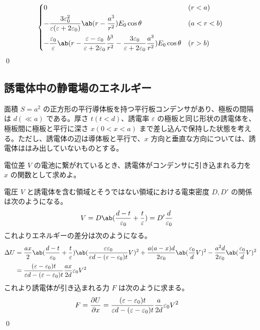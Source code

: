\documentclass[uplatex,dvipdfmx,a4paper,11pt]{jlreq}
\makeatletter
\numberwithin{equation}{section}
\theoremstyle{definition}
\renewenvironment{proof}[1][\proofname]{\par
  \normalfont
  \topsep6\p@\@plus6\p@ \trivlist
  \item[\hskip\labelsep{\bfseries #1}\@addpunct{\bfseries}]\ignorespaces\quad\par
}{%
  \qed\endtrivlist\@endpefalse
}
\renewcommand\proofname{証明}
\makeatother
\begin{document}
\begin{proof}
\begin{align}
\begin{dcases}
                          0                                                                                                                                                                                                            & (r < a)     \\
                          -\frac{3\varepsilon_0^2}{\varepsilon(\varepsilon + 2\varepsilon_0)}\ab(r - \frac{a^3}{r^2})E_0\cos\theta                                                                                                     & (a < r < b) \\
                          -\frac{\varepsilon_0}{\varepsilon}\ab(r - \frac{\varepsilon - \varepsilon_0}{\varepsilon + 2\varepsilon_0}\frac{b^3}{r^2} - \frac{3\varepsilon_0}{\varepsilon + 2\varepsilon_0}\frac{a^3}{r^2})E_0\cos\theta & (r > b)     \\
                        \end{dcases}
  \end{align}
\end{proof}


\subsection{誘電体中の静電場のエネルギー}
面積 $S = a^2$ の正方形の平行導体板を持つ平行板コンデンサがあり、極板の間隔は $d (\ll a)$ である。厚さ $t (t < d)$、誘電率 $\varepsilon$ の極板と同じ形状の誘電体を、極板間に極板と平行に深さ $x (0 < x < a)$ まで差し込んで保持した状態を考える。ただし、誘電体の辺は導体板と平行で、$x$ 方向と垂直な方向については、誘電体ははみ出していないものとする。
\begin{problem}
電位差 $V$ の電池に繋がれているとき、誘電体がコンデンサに引き込まれる力を $x$ の関数として求めよ。
\end{problem}
\begin{proof}
  電圧 $V$ と誘電体を含む領域とそうではない領域における電束密度 $D, D'$ の関係は次のようになる。
  \begin{align}
    V & = D\ab(\frac{d - t}{\varepsilon_0} + \frac{t}{\varepsilon}) = D'\frac{d}{\varepsilon_0}
  \end{align}
  これよりエネルギーの差分は次のようになる。
  \begin{align}
    \Delta U & = \frac{ax}{2}\ab(\frac{d - t}{\varepsilon_0} + \frac{t}{\varepsilon})\ab(\frac{\varepsilon\varepsilon_0}{\varepsilon d - (\varepsilon - \varepsilon_0)t}V)^2 + \frac{a(a - x)d}{2\varepsilon_0}\ab(\frac{\varepsilon_0}{d}V)^2 - \frac{a^2d}{2\varepsilon_0}\ab(\frac{\varepsilon_0}{d}V)^2 \\
             & = \frac{(\varepsilon - \varepsilon_0)t}{\varepsilon d - (\varepsilon - \varepsilon_0)t}\frac{ax}{2d}\varepsilon_0V^2
  \end{align}
  これより誘電体が引き込まれる力 $F$ は次のように求まる。
  \begin{align}
    F & = \diffp{U}{x} = \frac{(\varepsilon - \varepsilon_0)t}{\varepsilon d - (\varepsilon - \varepsilon_0)t}\frac{a}{2d}\varepsilon_0V^2
  \end{align}
\end{proof}
\end{document}
